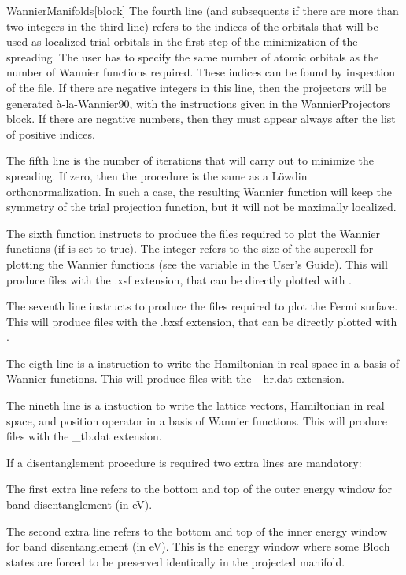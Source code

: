 \begin{fdfentry}{WannierManifolds}[block]
    The fourth line (and subsequents if there are more than two integers
    in the third line) refers to the indices of the orbitals that will be used
    as localized trial orbitals in the first step of the minimization
    of the spreading.
    The user has to specify the same number of atomic orbitals as the number
    of Wannier functions required.
    These indices can be found by inspection of the
     file.
    If there are negative integers in this line, then the projectors will
    be generated \`a-la-Wannier90, with the instructions given in the
    WannierProjectors block.
    If there are negative numbers, then they must appear always after
    the list of positive indices.

    The fifth line is the number of iterations that 
    will carry out to minimize the spreading.
    If zero, then the procedure is the same as a L\"owdin orthonormalization.
    In such a case, the resulting Wannier function will keep the symmetry
    of the trial projection function, but it will not be maximally localized.

    The sixth function instructs  to produce the files
    required to plot the Wannier functions
    (if  is set to true).
    The integer refers to the size of the supercell for plotting the
    Wannier functions (see the variable
     in the  User's Guide).
    This will produce files with the .xsf extension, that can be directly plotted
    with .

    The seventh line instructs  to produce the files
    required to plot the Fermi surface.
    This will produce files with the .bxsf extension, that can be directly plotted
    with .

    The eigth line is a instruction to write the Hamiltonian in real space
    in a basis of Wannier functions.
    This will produce files with the \_hr.dat extension.

    The nineth line is a instuction to write the lattice vectors, Hamiltonian
    in real space, and position operator in a basis of Wannier functions.
    This will produce files with the \_tb.dat extension.

    If a disentanglement procedure is required two extra lines are mandatory:

    The first extra line refers to the bottom and top of the outer
    energy window for band disentanglement (in eV).

    The second extra line refers to the bottom and top of the inner
    energy window for band disentanglement (in eV).
    This is the energy window where some Bloch states are forced to be
    preserved identically in the projected manifold.

  \end{fdfentry}

